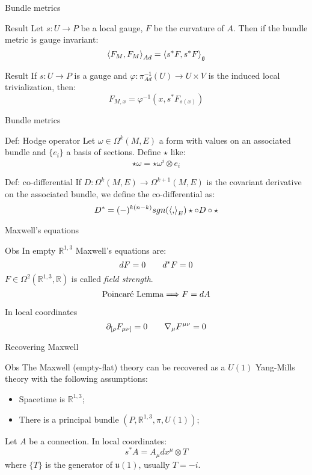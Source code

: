 \documentclass{beamer}
\begin{document}
\begin{frame}{Bundle metrics}
	\begin{block}{Result}
		Let $s:U\rightarrow P$ be a local gauge, $F$ be the curvature of $A$. Then if the bundle metric is gauge invariant:
		$$\braket{F_M,F_M}_{Ad}=\braket{s^*F,s^*F}_\mathfrak{g}$$
	\end{block}
	\begin{block}{Result}
		If $s:U\rightarrow P$ is a gauge and $\varphi:\pi_{Ad}^{-1}(U)\rightarrow U\times V$ is the induced local trivialization, then:
		$$F_{M,x}=\varphi^{-1}(x,s^*F_{s(x)})$$
	\end{block}
\end{frame}
\begin{frame}{Bundle metrics}
	\begin{exampleblock}{Def: Hodge operator}
		Let $\omega\in\Omega^k(M,E)$ a form with values on an associated bundle and $\{e_i\}$ a basis of sections. Define $\star$ like:
		$$\star\omega=\star\omega^i\otimes e_i$$
	\end{exampleblock}
	\begin{exampleblock}{Def: co-differential}
		If $D:\Omega^k(M,E)\rightarrow\Omega^{k+1}(M,E)$ is the covariant derivative on the associated bundle, we define the co-differential as:
		$$D^*=(-)^{k(n-k)}sgn(\braket{,}_E)\star\circ D\circ\star$$
	\end{exampleblock}
\end{frame}
\begin{frame}{Maxwell's equations}
	\begin{exampleblock}{Obs}
		In empty $\mathbb{R}^{1,3}$ Maxwell's equations are:
		$$dF=0\hspace{20 pt} d^*F=0$$ 
		$F\in\Omega^2(\mathbb{R}^{1,3},\mathbb{R})$ is called \textit{field strength}.
		$$\hbox{Poincaré Lemma}\Longrightarrow F=dA$$
	\end{exampleblock}
	\begin{block}{In local coordinates}
		$$\partial_{[\rho} F_{\mu\nu]}=0\hspace{20 pt} \nabla_\mu F^{\mu\nu}=0$$
	\end{block}
\end{frame}
\begin{frame}{Recovering Maxwell}
	\begin{exampleblock}{Obs}
		The Maxwell (empty-flat) theory can be recovered as a $U(1)$ Yang-Mills theory with the following assumptions:
		\begin{itemize}
			\item Spacetime is $\mathbb{R}^{1,3}$;
			\item There is a principal bundle $(P,\mathbb{R}^{1,3},\pi,U(1))$;
		\end{itemize}
	\end{exampleblock}
	Let $A$ be a connection. In local coordinates: $$s^*A=A_{\mu}dx^\mu\otimes T$$
	where $\{T\}$ is the generator of $\mathfrak{u}(1)$, usually $T=-i$.
\end{frame}
\end{document}
